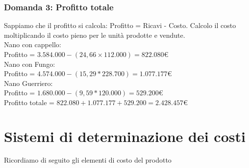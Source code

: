 \documentclass{article}
\begin{document}
\subsubsection{Domanda 3: Profitto totale}
Sappiamo che il profitto si calcola: Profitto = Ricavi - Costo. Calcolo il costo moltiplicando il costo pieno per le unità prodotte e vendute.
\vspace*{0.2cm}\\
Nano con cappello:\\
Profitto = $ 3.584.000 - (24,66 \times 112.000) = 822.080$\euro 
\vspace*{0.1cm}\\
Nano con Fungo:\\
Profitto = $4.574.000 - (15,29 * 228.700)= 1.077.177$\euro 
\vspace*{0.2cm}\\
Nano Guerriero:\\
Profitto = $1.680.000 - (9,59 * 120.000) = 529.200$\euro 
\vspace*{0.2cm}\\
Profitto totale = $ 822.080 + 1.077.177 + 529.200 = 2.428.457$\euro   


\section{Sistemi di determinazione dei costi}
Ricordiamo di seguito gli elementi di costo del prodotto
\end{document}
